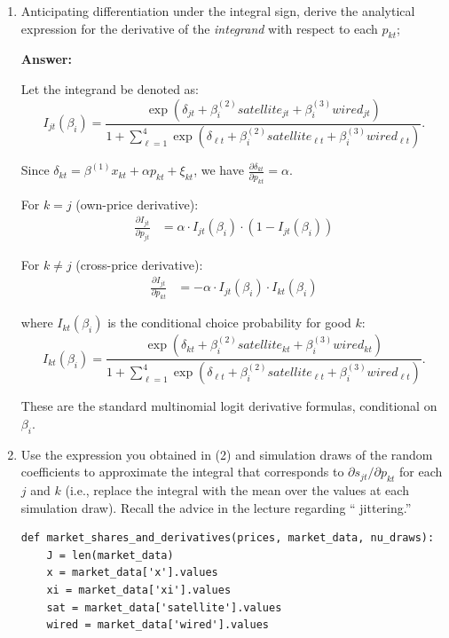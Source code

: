 \documentclass[english,11pt]{article}
\begin{document}
\begin{enumerate}
\begin{enumerate}
\begin{enumerate}
\item Anticipating differentiation under the integral sign, derive the
analytical expression for the derivative of the \textit{integrand} with
respect to each $p_{kt}$; 

\textbf{Answer:}

Let the integrand be denoted as:
\begin{equation*}
I_{jt}(\beta_i) = \frac{\exp(\delta_{jt} + \beta_i^{(2)}satellite_{jt} + \beta_i^{(3)}wired_{jt})}{1 + \sum_{\ell=1}^4 \exp(\delta_{\ell t} + \beta_i^{(2)}satellite_{\ell t} + \beta_i^{(3)}wired_{\ell t})}.
\end{equation*}

Since $\delta_{kt} = \beta^{(1)}x_{kt} + \alpha p_{kt} + \xi_{kt}$, we have $\frac{\partial \delta_{kt}}{\partial p_{kt}} = \alpha$.

For $k = j$ (own-price derivative):
\begin{align*}
\frac{\partial I_{jt}}{\partial p_{jt}} &= \alpha \cdot I_{jt}(\beta_i) \cdot (1 - I_{jt}(\beta_i))
\end{align*}

For $k \neq j$ (cross-price derivative):
\begin{align*}
\frac{\partial I_{jt}}{\partial p_{kt}} &= -\alpha \cdot I_{jt}(\beta_i) \cdot I_{kt}(\beta_i)
\end{align*}

where $I_{kt}(\beta_i)$ is the conditional choice probability for good $k$:
\begin{equation*}
I_{kt}(\beta_i) = \frac{\exp(\delta_{kt} + \beta_i^{(2)}satellite_{kt} + \beta_i^{(3)}wired_{kt})}{1 + \sum_{\ell=1}^4 \exp(\delta_{\ell t} + \beta_i^{(2)}satellite_{\ell t} + \beta_i^{(3)}wired_{\ell t})}.
\end{equation*}

These are the standard multinomial logit derivative formulas, conditional on $\beta_i$.


\item Use the expression you obtained in (2) and simulation draws of the
random coefficients to approximate the integral that corresponds to $%
\partial s_{jt}/\partial p_{kt}$ for each $j$ and $k$ (i.e., replace
the integral with the mean over the values at each simulation draw). Recall the advice in the lecture regarding \textquotedblleft
jittering.\textquotedblright\ \newline

\begin{verbatim}
def market_shares_and_derivatives(prices, market_data, nu_draws):
    J = len(market_data)
    x = market_data['x'].values
    xi = market_data['xi'].values
    sat = market_data['satellite'].values
    wired = market_data['wired'].values
    

\end{verbatim}
\end{enumerate}
\end{enumerate}
\end{enumerate}
\end{document}

